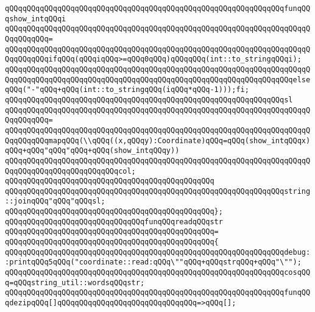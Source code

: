 \verb|qQQqqQQqqQQqqQQqqQQqqQQqqQQqqQQqqQQqqQQqqQQqqQQqqQQqqQQqqQQqqQQqfunqQQqshow_intqQQqi|\newline
\verb|qQQqqQQqqQQqqQQqqQQqqQQqqQQqqQQqqQQqqQQqqQQqqQQqqQQqqQQqqQQqqQQqqQQqqQQqqQQqqQQq=|\newline
\verb|qQQqqQQqqQQqqQQqqQQqqQQqqQQqqQQqqQQqqQQqqQQqqQQqqQQqqQQqqQQqqQQqqQQqqQQqqQQqqQQqifqQQq(qQQqiqQQq>=qQQq0qQQq)qQQqqQQq(int::to_stringqQQqi);|\newline
\verb|qQQqqQQqqQQqqQQqqQQqqQQqqQQqqQQqqQQqqQQqqQQqqQQqqQQqqQQqqQQqqQQqqQQqqQQqqQQqqQQqqQQqqQQqqQQqqQQqqQQqqQQqqQQqqQQqqQQqqQQqqQQqqQQqqQQqqQQqelseqQQq("-"qQQq+qQQq(int::to_stringqQQq(iqQQq*qQQq-1)));fi;|\newline
\newline
\verb|qQQqqQQqqQQqqQQqqQQqqQQqqQQqqQQqqQQqqQQqqQQqqQQqqQQqqQQqqQQqqQQqsl|\newline
\verb|qQQqqQQqqQQqqQQqqQQqqQQqqQQqqQQqqQQqqQQqqQQqqQQqqQQqqQQqqQQqqQQqqQQqqQQqqQQqqQQq=|\newline
\verb|qQQqqQQqqQQqqQQqqQQqqQQqqQQqqQQqqQQqqQQqqQQqqQQqqQQqqQQqqQQqqQQqqQQqqQQqqQQqqQQqmapqQQq(\\qQQq((x,qQQqy):Coordinate)qQQq=qQQq(show_intqQQqx)qQQq+qQQq"qQQq"qQQq+qQQq(show_intqQQqy))|\newline
\verb|qQQqqQQqqQQqqQQqqQQqqQQqqQQqqQQqqQQqqQQqqQQqqQQqqQQqqQQqqQQqqQQqqQQqqQQqqQQqqQQqqQQqqQQqqQQqqQQqcol;|\newline
\newline
\verb|qQQqqQQqqQQqqQQqqQQqqQQqqQQqqQQqqQQqqQQqqQQqqQQq|\newline
\verb|qQQqqQQqqQQqqQQqqQQqqQQqqQQqqQQqqQQqqQQqqQQqqQQqqQQqqQQqqQQqqQQqstring::joinqQQq"qQQq"qQQqsl;|\newline
\verb|qQQqqQQqqQQqqQQqqQQqqQQqqQQqqQQqqQQqqQQqqQQqqQQq};|\newline
\newline
\verb|qQQqqQQqqQQqqQQqqQQqqQQqqQQqqQQqfunqQQqreadqQQqstr|\newline
\verb|qQQqqQQqqQQqqQQqqQQqqQQqqQQqqQQqqQQqqQQqqQQqqQQq=|\newline
\verb|qQQqqQQqqQQqqQQqqQQqqQQqqQQqqQQqqQQqqQQqqQQqqQQq{|\newline
\verb|qQQqqQQqqQQqqQQqqQQqqQQqqQQqqQQqqQQqqQQqqQQqqQQqqQQqqQQqqQQqqQQqdebug::printqQQq5qQQq("coordinate::read:qQQq\""qQQq+qQQqstrqQQq+qQQq"\"");|\newline
\verb|qQQqqQQqqQQqqQQqqQQqqQQqqQQqqQQqqQQqqQQqqQQqqQQqqQQqqQQqqQQqqQQqcosqQQq=qQQqstring_util::wordsqQQqstr;|\newline
\verb|qQQqqQQqqQQqqQQqqQQqqQQqqQQqqQQqqQQqqQQqqQQqqQQqqQQqqQQqqQQqqQQqfunqQQqdezipqQQq[]qQQqqQQqqQQqqQQqqQQqqQQqqQQqqQQq=>qQQq[];|\newline

